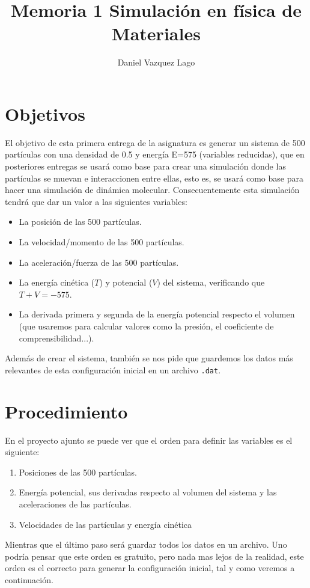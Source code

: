 \documentclass[11pt]{article}
\author{Daniel Vazquez Lago}
\title{Memoria 1 Simulación en física de Materiales}
\begin{document}
\maketitle
\newpage

\tableofcontents


\section{Objetivos}

El objetivo de esta primera entrega de la asignatura es generar un sistema de 500 partículas con una densidad de 0.5 y energía E=575 (variables reducidas), que en posteriores entregas se usará como base para crear una simulación donde las partículas se muevan e interaccionen entre ellas, esto es, se usará como base para hacer una simulación de dinámica molecular. Consecuentemente esta simulación tendrá que dar un valor a las siguientes variables:

\begin{itemize}
	\item La posición de las 500 partículas.
	\item La velocidad/momento de las 500 partículas.
	\item La aceleración/fuerza de las 500 partículas.
	\item La energía cinética ($T$) y potencial ($V$) del sistema, verificando que $T+V=-575$.
	\item La derivada primera y segunda de la energía potencial respecto el volumen (que usaremos para calcular valores como la presión, el coeficiente de comprensibilidad...).
\end{itemize}
Además de crear el sistema, también se nos pide que guardemos los datos más relevantes de esta configuración inicial en un archivo \texttt{.dat}. 

\section{Procedimiento} \label{Sec:02}

En el proyecto ajunto se puede ver que el orden para definir las variables es el siguiente: 

\begin{enumerate}
	\item Posiciones de las 500 partículas.
	\item Energía potencial, sus derivadas respecto al volumen del sistema y las aceleraciones de las partículas. 
	\item Velocidades de las partículas y energía cinética
\end{enumerate}
Mientras que el último paso será guardar todos los datos en un archivo. Uno podría pensar que este orden es gratuito, pero nada mas lejos de la realidad, este orden es el correcto para generar la configuración inicial, tal y como veremos a continuación. \\
\end{document}
